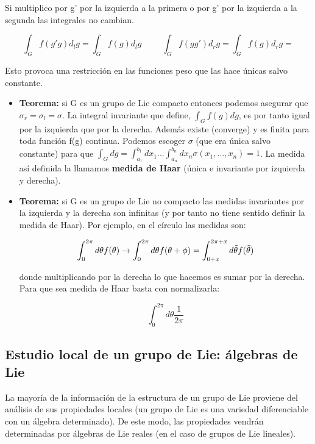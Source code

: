Si multiplico por g' por la izquierda a la primera o por g' por la izquierda a la segunda las integrales no cambian.

$$\int _G f(g'g)d_lg=\int _G f(g)d_lg \hspace{1cm} \int _G f(gg')d_rg=\int _G f(g)d_rg=$$

Esto provoca una restricción en las funciones peso que las hace únicas salvo constante.

\bigskip
\begin{itemize}
\item      \textbf{Teorema:} si G es un grupo de Lie compacto entonces podemos asegurar que $\sigma _r=\sigma_l=\sigma$. La integral invariante que define, $\int _G f(g)d g$, es por tanto igual por la izquierda que por la derecha. Además existe (converge) y es finita para toda función f(g) continua. Podemos escoger $\sigma$ (que era única salvo constante) para que $\int _G dg=\int ^{b_1}_{a_1} dx_1...\int ^{b_n}_{a_n} dx_n \sigma (x_1,...,x_n)=1$. La medida así definida la llamamos \textbf{medida de Haar} (única e invariante por izquierda y derecha).

\item \textbf{Teorema:} si G es un grupo de Lie no compacto las medidas invariantes por la izquierda y la derecha son infinitas (y por tanto no tiene sentido definir la medida de Haar). Por ejemplo, en el círculo las medidas son:

$$\int ^{2\pi}_0 d\theta f(\theta) \to \int ^{2\pi}_0 d\theta f(\theta +\phi)= \int ^{2\pi + x}_{0+x} d\Tilde{\theta} f(\Tilde{\theta})$$

donde multiplicando por la derecha lo que hacemos es sumar por la derecha. Para que sea medida de Haar basta con normalizarla:

$$\int ^{2\pi}_0 d \theta \frac{1}{2\pi}$$

\end{itemize}

\subsection{Estudio local de un grupo de Lie: álgebras de Lie}

La mayoría de la información de la estructura de un grupo de Lie proviene del análisis de sus propiedades locales (un grupo de Lie es una variedad diferenciable con un álgebra determinado). De este modo, las propiedades vendrán determinadas por álgebras de Lie reales (en el caso de grupos de Lie lineales).

